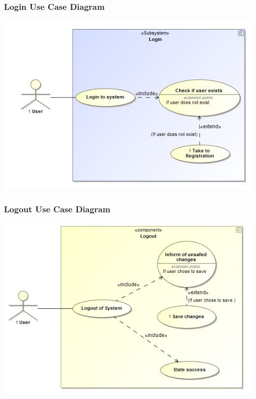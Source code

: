 \documentclass[a4paper,12pt]{article}
\begin{document}
	\subsubsection{Login Use Case Diagram}
	\includegraphics[width=1\textwidth]{./Login.jpg}\\[1.5cm] 
	
	\subsubsection{Logout Use Case Diagram}
	\includegraphics[width=1\textwidth]{./Logout.jpg}\\[1.5cm]
	
\end{document}
